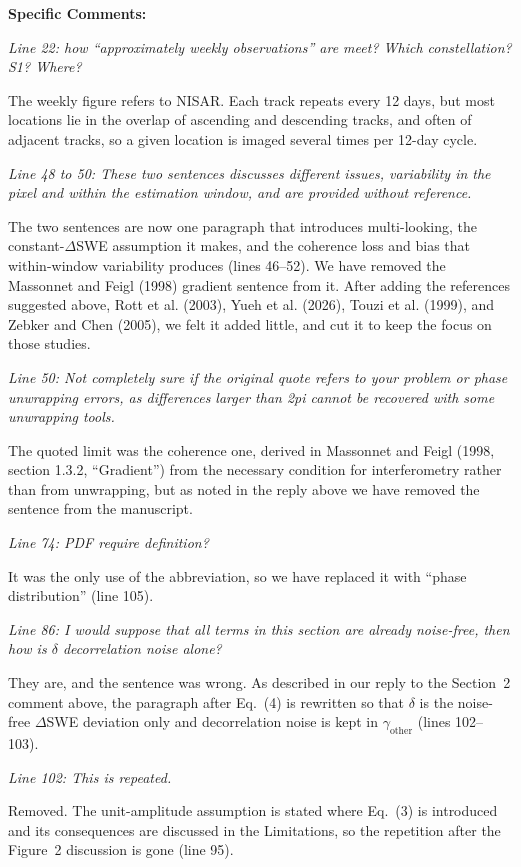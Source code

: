 \documentclass[tc, manuscript]{copernicus}
\begin{document}
\textbf{Specific Comments:}

\textit{Line 22: how “approximately weekly observations” are meet? Which constellation? S1? Where?}

The weekly figure refers to NISAR. Each track repeats every 12 days, but most locations lie in the overlap of ascending and descending tracks, and often of adjacent tracks, so a given location is imaged several times per 12-day cycle.

\textit{Line 48 to 50: These two sentences discusses different issues, variability in the pixel and within the estimation window, and are provided without reference.}

The two sentences are now one paragraph that introduces multi-looking, the constant-$\Delta$SWE assumption it makes, and the coherence loss and bias that within-window variability produces (lines 46--52). We have removed the Massonnet and Feigl (1998) gradient sentence from it. After adding the references suggested above, Rott et al. (2003), Yueh et al. (2026), Touzi et al. (1999), and Zebker and Chen (2005), we felt it added little, and cut it to keep the focus on those studies.

\textit{Line 50: Not completely sure if the original quote refers to your problem or phase unwrapping errors, as differences larger than 2pi cannot be recovered with some unwrapping tools.}

The quoted limit was the coherence one, derived in Massonnet and Feigl (1998, section 1.3.2, ``Gradient'') from the necessary condition for interferometry rather than from unwrapping, but as noted in the reply above we have removed the sentence from the manuscript.

\textit{Line 74: PDF require definition?}

It was the only use of the abbreviation, so we have replaced it with ``phase distribution'' (line 105).

\textit{Line 86: I would suppose that all terms in this section are already noise-free, then how is $\delta$ decorrelation noise alone?}

They are, and the sentence was wrong. As described in our reply to the Section~2 comment above, the paragraph after Eq.~(4) is rewritten so that $\delta$ is the noise-free $\Delta$SWE deviation only and decorrelation noise is kept in $\gamma_\mathrm{other}$ (lines 102--103).

\textit{Line 102: This is repeated.}

Removed. The unit-amplitude assumption is stated where Eq.~(3) is introduced and its consequences are discussed in the Limitations, so the repetition after the Figure~2 discussion is gone (line 95).
\end{document}
